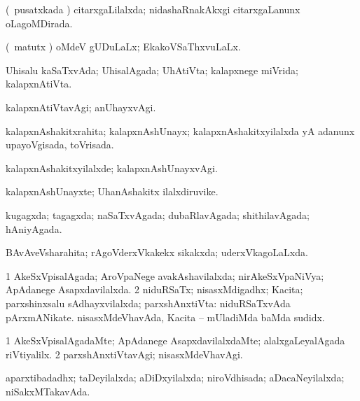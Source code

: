 \bentry
{} 
\gl{\gu}
\expl{}
\bmng
(\kanmu\ pusatxkada \vi) citarxgaLilalxda; nidashaRnakAkxgi citarxgaLanunx oLagoMDirada. 
\emng
\eentry

\bentry
{} 
\gl{\gu}
\expl{}
\bmng
(\savi\ matutx \pArxvi) oMdeV gUDuLaLx; EkakoVSaThxvuLaLx. 
\emng
\eentry

\bentry
{} 
\gl{\gu}
\expl{}
\bmng
Uhisalu kaSaTxvAda; UhisalAgada; UhAtiVta; kalapxnege miVrida; kalapxnAtiVta. 
\emng
\eentry

\bentry
{} 
\gl{\kirxvi}
\expl{}
\bmng
kalapxnAtiVtavAgi; anUhayxvAgi. 
\emng
\eentry

\bentry
{} 
\gl{\gu}
\expl{}
\bmng
kalapxnAshakitxrahita; kalapxnAshUnayx; kalapxnAshakitxyilalxda yA adanunx upayoVgisada, toVrisada. 
\emng
\eentry

\bentry
{} 
\gl{\kirxvi}
\expl{}
\bmng
kalapxnAshakitxyilalxde; kalapxnAshUnayxvAgi. 
\emng
\eentry

\bentry
{} 
\gl{\nA}
\expl{}
\bmng
kalapxnAshUnayxte; UhanAshakitx ilalxdiruvike. 
\emng
\eentry

\bentry
{} 
\gl{\gu}
\expl{}
\bmng
kugagxda; tagagxda; naSaTxvAgada; dubaRlavAgada; shithilavAgada; hAniyAgada. 
\emng
\eentry

\bentry
{} 
\gl{\gu}
\expl{}
\bmng
BAvAveVsharahita; rAgoVderxVkakekx sikakxda; uderxVkagoLaLxda. 
\emng
\eentry

\bentry
{} 
\gl{\gu}
\expl{}
\bmng
\bnum
\num{1} AkeSxVpisalAgada; AroVpaNege avakAshavilalxda; nirAkeSxVpaNiVya; ApAdanege Asapxdavilalxda. 
\num{2} niduRSaTx; nisasxMdigadhx; Kacita; parxshinxsalu sAdhayxvilalxda; parxshAnxtiVta:  niduRSaTxvAda pArxmANikate.  nisasxMdeVhavAda, Kacita -- mUladiMda baMda sudidx. 
\enum
\emng
\eentry

\bentry
{} 
\gl{\kirxvi}
\expl{}
\bmng
\bnum
\num{1} AkeSxVpisalAgadaMte; ApAdanege AsapxdavilalxdaMte; alalxgaLeyalAgada riVtiyalilx. 
\num{2} parxshAnxtiVtavAgi; nisasxMdeVhavAgi. 
\enum
\emng
\eentry

\bentry
{} 
\gl{\gu}
\expl{}
\bmng
aparxtibadadhx; taDeyilalxda; aDiDxyilalxda; niroVdhisada; aDacaNeyilalxda; niSakxMTakavAda. 
\emng
\eentry

